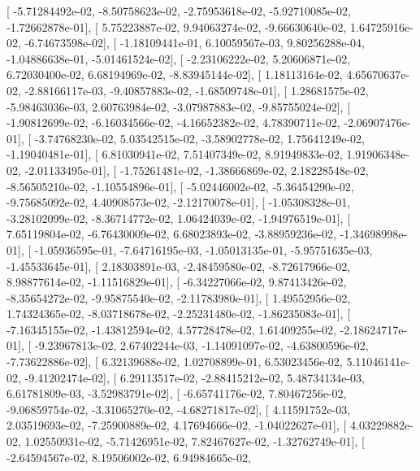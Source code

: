 \documentclass{article}
\begin{document}
       [ -5.71284492e-02,  -8.50758623e-02,  -2.75953618e-02,
         -5.92710085e-02,  -1.72662878e-01],
       [  5.75223887e-02,   9.94063274e-02,  -9.66630640e-02,
          1.64725916e-02,  -6.74673598e-02],
       [ -1.18109441e-01,   6.10059567e-03,   9.80256288e-04,
         -1.04886638e-01,  -5.01461524e-02],
       [ -2.23106222e-02,   5.20606871e-02,   6.72030400e-02,
          6.68194969e-02,  -8.83945144e-02],
       [  1.18113164e-02,   4.65670637e-02,  -2.88166117e-03,
         -9.40857883e-02,  -1.68509748e-01],
       [  1.28681575e-02,  -5.98463036e-03,   2.60763984e-02,
         -3.07987883e-02,  -9.85755024e-02],
       [ -1.90812699e-02,  -6.16034566e-02,  -4.16652382e-02,
          4.78390711e-02,  -2.06907476e-01],
       [ -3.74768230e-02,   5.03542515e-02,  -3.58902778e-02,
          1.75641249e-02,  -1.19040481e-01],
       [  6.81030941e-02,   7.51407349e-02,   8.91949833e-02,
          1.91906348e-02,  -2.01133495e-01],
       [ -1.75261481e-02,  -1.38666869e-02,   2.18228548e-02,
         -8.56505210e-02,  -1.10554896e-01],
       [ -5.02446002e-02,  -5.36454290e-02,  -9.75685092e-02,
          4.40908573e-02,  -2.12170078e-01],
       [ -1.05308328e-01,  -3.28102099e-02,  -8.36714772e-02,
          1.06424039e-02,  -1.94976519e-01],
       [  7.65119804e-02,  -6.76430009e-02,   6.68023893e-02,
         -3.88959236e-02,  -1.34698998e-01],
       [ -1.05936595e-01,  -7.64716195e-03,  -1.05013135e-01,
         -5.95751635e-03,  -1.45533645e-01],
       [  2.18303891e-03,  -2.48459580e-02,  -8.72617966e-02,
          8.98877614e-02,  -1.11516829e-01],
       [ -6.34227066e-02,   9.87413426e-02,  -8.35654272e-02,
         -9.95875540e-02,  -2.11783980e-01],
       [  1.49552956e-02,   1.74324365e-02,  -8.03718678e-02,
         -2.25231480e-02,  -1.86235083e-01],
       [ -7.16345155e-02,  -1.43812594e-02,   4.57728478e-02,
          1.61409255e-02,  -2.18624717e-01],
       [ -9.23967813e-02,   2.67402244e-03,  -1.14091097e-02,
         -4.63800596e-02,  -7.73622886e-02],
       [  6.32139688e-02,   1.02708899e-01,   6.53023456e-02,
          5.11046141e-02,  -9.41202474e-02],
       [  6.29113517e-02,  -2.88415212e-02,   5.48734134e-03,
          6.61781809e-03,  -3.52983791e-02],
       [ -6.65741176e-02,   7.80467256e-02,  -9.06859754e-02,
         -3.31065270e-02,  -4.68271817e-02],
       [  4.11591752e-03,   2.03519693e-02,  -7.25900889e-02,
          4.17694666e-02,  -1.04022627e-01],
       [  4.03229882e-02,   1.02550931e-02,  -5.71426951e-02,
          7.82467627e-02,  -1.32762749e-01],
       [ -2.64594567e-02,   8.19506002e-02,   6.94984665e-02,
\end{document}
